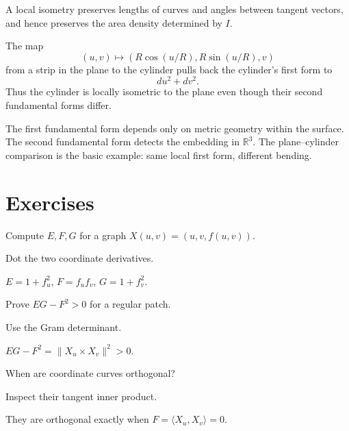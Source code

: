\begin{proposition}\label{prop:vii15-isometry-consequences}
A local isometry preserves lengths of curves and angles between tangent vectors, and hence preserves the area density determined by \(I\).
\end{proposition}

\begin{example}\label{ex:vii15-plane-cylinder}
The map
\[
(u,v)\longmapsto(R\cos(u/R),R\sin(u/R),v)
\]
from a strip in the plane to the cylinder pulls back the cylinder's first form to
\[
du^2+dv^2.
\]
Thus the cylinder is locally isometric to the plane even though their second fundamental forms differ.
\end{example}

\begin{remark}\label{rem:vii15-intrinsic-extrinsic}
The first fundamental form depends only on metric geometry within the surface.  The second fundamental form detects the embedding in \(\mathbb R^3\).  The plane--cylinder comparison is the basic example: same local first form, different bending.
\end{remark}

\section{Exercises}
\begin{exercise}\label{exr:vii15-01}
Compute \(E,F,G\) for a graph \(X(u,v)=(u,v,f(u,v))\).
\end{exercise}
\begin{hint}
Dot the two coordinate derivatives.
\end{hint}
\begin{solution}
\(E=1+f_u^2\), \(F=f_uf_v\), \(G=1+f_v^2\).
\end{solution}

\begin{exercise}\label{exr:vii15-02}
Prove \(EG-F^2>0\) for a regular patch.
\end{exercise}
\begin{hint}
Use the Gram determinant.
\end{hint}
\begin{solution}
\(EG-F^2=\|X_u\times X_v\|^2>0\).
\end{solution}

\begin{exercise}\label{exr:vii15-03}
When are coordinate curves orthogonal?
\end{exercise}
\begin{hint}
Inspect their tangent inner product.
\end{hint}
\begin{solution}
They are orthogonal exactly when \(F=\langle X_u,X_v\rangle=0\).
\end{solution}

